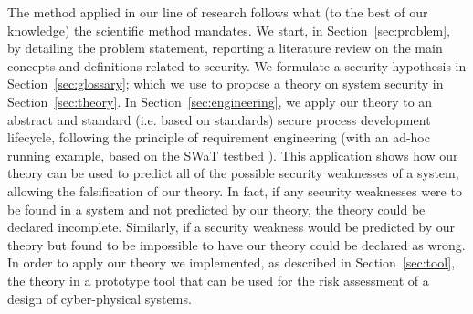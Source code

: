 The method applied in our line of research follows what
(to the best of our knowledge) the scientific method mandates. We start, in
Section~\ref{sec:problem}, by detailing the problem statement, reporting a
literature review on the main concepts and definitions related to security.  We
formulate 
a security hypothesis %
in Section~\ref{sec:glossary}; which we use to propose a theory on system
security in Section~\ref{sec:theory}. In Section~\ref{sec:engineering}, we
apply our theory to an abstract and standard (i.e.  based on standards) secure
process development lifecycle, following the principle of requirement
engineering  (with an ad-hoc running example, based on the SWaT testbed
\autocite{Mathur2016swat}). This application shows how our theory can be used
to predict all of the possible security weaknesses of a system, allowing the
falsification of our theory.  In fact, if any security weaknesses were to be
found in a system and not predicted by our theory, the theory could be declared
incomplete.  Similarly, if a security weakness would be predicted by our theory
but found to be impossible to have our theory could be declared as wrong.  In
order to apply our theory we implemented, as described in
Section~\ref{sec:tool}, the theory in a prototype tool that can be used for the
risk assessment of a design of cyber-physical systems.
